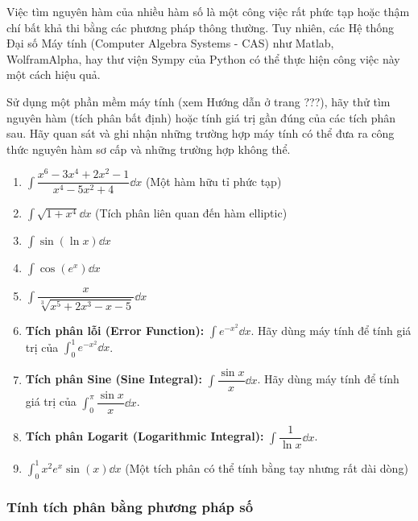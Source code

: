 \begin{exercise}
    Việc tìm nguyên hàm của nhiều hàm số là một công việc rất phức tạp hoặc thậm chí bất khả thi bằng các phương pháp thông thường. Tuy nhiên, các Hệ thống Đại số Máy tính (Computer Algebra Systems - CAS) như Matlab, WolframAlpha, hay thư viện Sympy của Python có thể thực hiện công việc này một cách hiệu quả.

    Sử dụng một phần mềm máy tính (xem Hướng dẫn ở trang ???), hãy thử tìm nguyên hàm (tích phân bất định) hoặc tính giá trị gần đúng của các tích phân sau. Hãy quan sát và ghi nhận những trường hợp máy tính có thể đưa ra công thức nguyên hàm sơ cấp và những trường hợp không thể.

    \begin{enumerate}[label=(\alph*)]
        \item $\int \dfrac{x^6 - 3x^4 + 2x^2 - 1}{x^4 - 5x^2 + 4} \dd x$ \quad (Một hàm hữu tỉ phức tạp)
        
        \item $\int \sqrt{1+x^4} \dd x$ \quad (Tích phân liên quan đến hàm elliptic)
        
        \item $\int \sin(\ln x) \dd x$
        
        \item $\int \cos(e^x) \dd x$
        
        \item $\int \dfrac{x}{\sqrt[3]{x^5 + 2x^3 - x - 5}} \dd x$
        
        \item \textbf{Tích phân lỗi (Error Function):} $\int e^{-x^2} \dd x$. Hãy dùng máy tính để tính giá trị của $\int_0^1 e^{-x^2} \dd x$.
        
        \item \textbf{Tích phân Sine (Sine Integral):} $\int \dfrac{\sin x}{x} \dd x$. Hãy dùng máy tính để tính giá trị của $\int_0^\pi \dfrac{\sin x}{x} \dd x$.
        
        \item \textbf{Tích phân Logarit (Logarithmic Integral):} $\int \dfrac{1}{\ln x} \dd x$.
        
        \item $\int_0^1 x^2 e^x \sin(x) \dd x$ \quad (Một tích phân có thể tính bằng tay nhưng rất dài dòng)
    \end{enumerate}
\end{exercise}

\subsubsection{Tính tích phân bằng phương pháp số}

